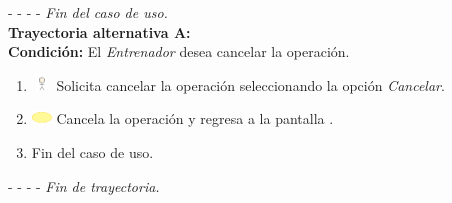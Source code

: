 - - - - \textit{Fin del caso de uso.} \\

\textbf{\large{Trayectoria alternativa A:}}\\
\textbf{Condición: } El \textit{Entrenador} desea cancelar la operación.

\begin{enumerate}
	\item \includegraphics[width=15pt, height=10pt]{./Figuras/iconosCU/usuario.png} Solicita cancelar la operación seleccionando la opción \textit{Cancelar}.
	\item \includegraphics[width=15pt]{./Figuras/iconosCU/herramienta.png} Cancela la operación y regresa a la pantalla .
	\item Fin del caso de uso.
\end{enumerate}

- - - - \textit{Fin de trayectoria.} \\

\clearpage